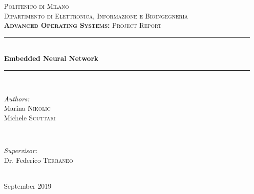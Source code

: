 \documentclass[12pt]{article}
\begin{document}

\begin{titlepage}
\center


\textsc{\LARGE Politenico di Milano}\\[1cm]
\textsc{\Large Dipartimento di Elettronica, Informazione e Bioingegneria}\\[0.5cm]
\textsc{\large \textbf{Advanced Operating Systems:} Project Report}\\[1.5cm]


\rule{\linewidth}{0.5mm} \\[0.4cm]
\vspace*{10pt}
{ \huge \bfseries Embedded Neural Network}\\[0.4cm]
\rule{\linewidth}{0.5mm} \\[1.5cm]


\begin{minipage}[t]{0.4\textwidth}
\begin{flushleft} \large
\emph{Authors:}\\
Marina \textsc{Nikolic}\\
Michele \textsc{Scuttari}
\end{flushleft}
\end{minipage}
~
\begin{minipage}[t]{0.4\textwidth}
\begin{flushright} \large
\emph{Supervisor:} \\
Dr. Federico \textsc{Terraneo}
\end{flushright}
\end{minipage}\\[1.5cm]


{\large September 2019}\\[1.5cm]



\end{titlepage}
\end{document}
